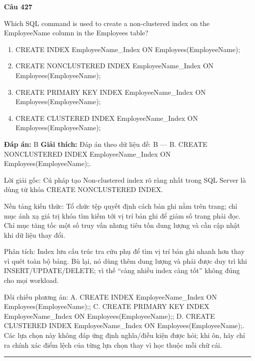 \documentclass[11pt,a4paper]{article}
\newenvironment{question}[1]{%
  \par\vspace{1em}\noindent\textbf{\large Câu #1}\par\vspace{0.4em}
}{%
  \par\vspace{1em}\hrule\vspace{0.6em}
}
\newenvironment{choices}{%
  \begin{enumerate}[label=\textbf{\Alph*.},leftmargin=2.2em,itemsep=2pt,topsep=3pt]
}{%
  \end{enumerate}
}
\newcommand{\choice}{\item}
\begin{document}
\begin{question}{427}
Which SQL command is used to create a non-clustered index on the EmployeeName column in the Employees table?
\begin{choices}
\choice CREATE INDEX EmployeeName_Index ON Employees(EmployeeName);
\choice CREATE NONCLUSTERED INDEX EmployeeName_Index ON Employees(EmployeeName);
\choice CREATE PRIMARY KEY INDEX EmployeeName_Index ON Employees(EmployeeName);
\choice CREATE CLUSTERED INDEX EmployeeName_Index ON Employees(EmployeeName);
\end{choices}
\textbf{Đáp án:} B
\textbf{Giải thích:} Đáp án theo dữ liệu đề: B — B. CREATE NONCLUSTERED INDEX EmployeeName_Index ON Employees(EmployeeName);.

Lời giải gốc: Cú pháp tạo Non-clustered index rõ ràng nhất trong SQL Server là dùng từ khóa CREATE NONCLUSTERED INDEX.

Nền tảng kiến thức: Tổ chức tệp quyết định cách bản ghi nằm trên trang; chỉ mục ánh xạ giá trị khóa tìm kiếm tới vị trí bản ghi để giảm số trang phải đọc. Chỉ mục tăng tốc một số truy vấn nhưng tiêu tốn dung lượng và cần cập nhật khi dữ liệu thay đổi.

Phân tích: Index lưu cấu trúc tra cứu phụ để tìm vị trí bản ghi nhanh hơn thay vì quét toàn bộ bảng. Bù lại, nó dùng thêm dung lượng và phải được duy trì khi INSERT/UPDATE/DELETE; vì thế “càng nhiều index càng tốt” không đúng cho mọi workload.

Đối chiếu phương án: A. CREATE INDEX EmployeeName_Index ON Employees(EmployeeName);; C. CREATE PRIMARY KEY INDEX EmployeeName_Index ON Employees(EmployeeName);; D. CREATE CLUSTERED INDEX EmployeeName_Index ON Employees(EmployeeName);. Các lựa chọn này không đáp ứng định nghĩa/điều kiện được hỏi; khi ôn, hãy chỉ ra chính xác điểm lệch của từng lựa chọn thay vì học thuộc mỗi chữ cái.
\end{question}
\end{document}

